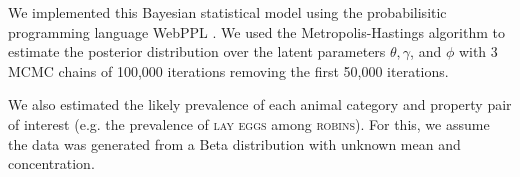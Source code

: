 \documentclass[10pt,letterpaper]{article}
\newcommand{\ndg}[1]{\textcolor{Green}{[ndg: #1]}}
\begin{document}
%
%
%
%



We implemented this Bayesian statistical model using the probabilisitic programming language WebPPL \cite{dippl}. 
We used the Metropolis-Hastings algorithm to estimate the posterior distribution over the latent parameters $\theta, \gamma$, and $\phi$ with 3 MCMC chains of 100,000 iterations removing the first 50,000 iterations.


We also estimated the likely prevalence of each animal category and property pair of interest (e.g. the prevalence of \textsc{lay eggs} among \textsc{robins}). %
For this, we assume the data was generated from a Beta distribution with unknown mean and concentration. 
\end{document}
